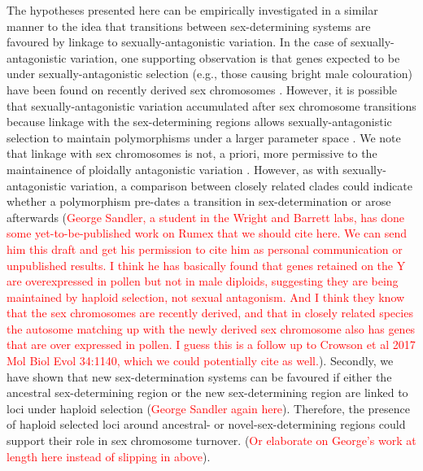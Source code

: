 \documentclass[12pt]{article}
\begin{document}
The hypotheses presented here can be empirically investigated in a similar manner to the idea that transitions between sex-determining systems are favoured by linkage to sexually-antagonistic variation. 
In the case of sexually-antagonistic variation, one supporting observation is that genes expected to be under sexually-antagonistic selection (e.g., those causing bright male colouration) have been found on recently derived sex chromosomes \citep{Lindholm:2002dw,Tripathi:2009cw,Ser:2010iq}.
However, it is possible that sexually-antagonistic variation accumulated after sex chromosome transitions because linkage with the sex-determining regions allows sexually-antagonistic selection to maintain polymorphisms under a larger parameter space \citep{Rice:1987hs,Jordan:2011fj}.
We note that linkage with sex chromosomes is not, a priori, more permissive to the maintainence of ploidally antagonistic variation \citep{Immler:2012tl}.
However, as with sexually-antagonistic variation, a comparison between closely related clades could indicate whether a polymorphism pre-dates a transition in sex-determination or arose afterwards (\textcolor{red}{George Sandler, a student in the Wright and Barrett labs, has done some yet-to-be-published work on Rumex that we should cite here. We can send him this draft and get his permission to cite him as personal communication or unpublished results. I think he has basically found that genes retained on the Y are overexpressed in pollen but not in male diploids, suggesting they are being maintained by haploid selection, not sexual antagonism. And I think they know that the sex chromosomes are recently derived, and that in closely related species the autosome matching up with the newly derived sex chromosome also has genes that are over expressed in pollen. I guess this is a follow up to Crowson et al 2017 Mol Biol Evol 34:1140, which we could potentially cite as well.}). 
Secondly, we have shown that new sex-determination systems can be favoured if either the ancestral sex-determining region or the new sex-determining region are linked to loci under haploid selection (\textcolor{red}{George Sandler again here}). 
Therefore, the presence of haploid selected loci around ancestral- or novel-sex-determining regions could support their role in sex chromosome turnover. 
(\textcolor{red}{Or elaborate on George's work at length here instead of slipping in above}).
\end{document}
